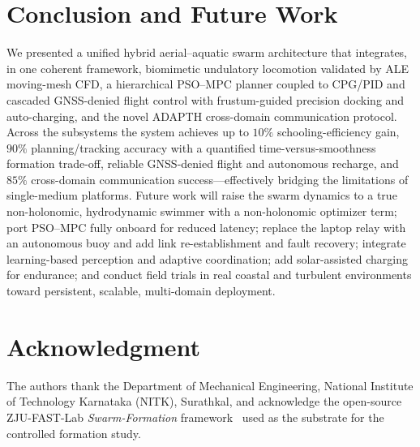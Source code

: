 \documentclass[journal]{IEEEtran}
\begin{document}
\section{Conclusion and Future Work}
\label{sec:concl}
We presented a unified hybrid aerial--aquatic swarm architecture that integrates,
in one coherent framework, biomimetic undulatory locomotion validated by ALE
moving-mesh CFD, a hierarchical PSO--MPC planner coupled to CPG/PID and cascaded
GNSS-denied flight control with frustum-guided precision docking and auto-charging,
and the novel ADAPTH cross-domain communication protocol. Across the subsystems the
system achieves up to $10\%$ schooling-efficiency gain, $90\%$ planning/tracking
accuracy with a quantified time-versus-smoothness formation trade-off, reliable
GNSS-denied flight and autonomous recharge, and $85\%$ cross-domain communication
success---effectively bridging the limitations of single-medium platforms. Future
work will raise the swarm dynamics to a true non-holonomic, hydrodynamic swimmer
with a non-holonomic optimizer term; port PSO--MPC fully onboard for reduced
latency; replace the laptop relay with an autonomous buoy and add link
re-establishment and fault recovery; integrate learning-based perception and
adaptive coordination; add solar-assisted charging for endurance; and conduct field
trials in real coastal and turbulent environments toward persistent, scalable,
multi-domain deployment.

\section*{Acknowledgment}
The authors thank the Department of Mechanical Engineering, National Institute of
Technology Karnataka (NITK), Surathkal, and acknowledge the open-source
ZJU-FAST-Lab \emph{Swarm-Formation} framework~\cite{quan2022distributed} used as
the substrate for the controlled formation study.



\end{document}
